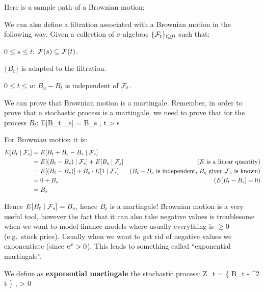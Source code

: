 Here is a sample path of a Brownian motion:


We can also define a filtration associated with a Brownian motion in the following way. Given a collection of
$\sigma$-algebras $\{ \mathcal{F}_{t} \}_{t \geq 0}$ such that:
\ben
\item $0 \leq s \leq t$: $\mathcal{F}(s) \subseteq \mathcal{F}(t)$.
\item $\{ B_{t} \}$ is adapted to the filtration.
\item $0 \leq t \leq u$: $B_{u} - B_{t}$ is independent of $\mathcal{F}_{t}$.
\een

We can prove that Brownian motion is a martingale. Remember, in order to prove that a stochastic process is a
martingale, we need to prove that for the process $B_{t}$:
\bse
E[B_{t} \mid \cF_{s}] = B_{s} \: , \qquad t > s
\ese

For Brownian motion it is:
\begin{align*}
E[B_{t} \mid \mathcal{F}_{s}] &= E[B_{t} + B_{s} - B_{s} \mid \mathcal{F}_{s}] \\
&= E[(B_{t} - B_{s}) \mid \mathcal{F}_{s}] + E[B_{s} \mid \mathcal{F}_{s}]
& \text{($E$ is a linear quantity)} \\
&= E[(B_{t} - B_{s})] + B_{s} \cdot E[1 \mid \mathcal{F}_{s}]
& \text{($B_{t} - B_{s}$ is independent, $B_{s}$ given $\mathcal{F}_{s}$ is known)} \\
&= 0 + B_{s}
& \text{($E[B_{t} - B_{s}] = 0$)} \\
&= B_{s}
\end{align*}

Hence $E[B_{t} \mid \mathcal{F}_{s}] = B_{s}$, hence $B_{t}$ is a martingale! \v

Brownian motion is a very useful tool, however the fact that it can also take negative values is troublesome when
we want to model finance models where usually everything is $\geq 0$ (e.g.\ stock price). Usually when we want to
get rid of negative values we exponentiate (since $\mathrm{e}^{x} > 0$). This leads to something called ``exponential
martingale''.

We define as \textbf{exponential martingale} the stochastic process:
\bse
Z_{t} = \exp \Big\{ \sigma B_{t} -  \sigma^{2} t \Big\} \: , \qquad \sigma > 0
\ese
\ed

